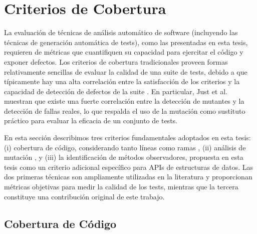



\section{Criterios de Cobertura}
\label{sec:coverage}
La evaluación de técnicas de análisis automático de software (incluyendo las
técnicas de generación automática de tests), como las presentadas en esta tesis, requieren de métricas que cuantifiquen su capacidad para ejercitar el código y exponer defectos. 
Los criterios de cobertura tradicionales proveen formas relativamente sencillas de evaluar 
la calidad de una suite de tests, debido a que típicamente hay una alta correlación entre
la satisfacción de los criterios y la capacidad de detección de defectos de la
suite \cite{Ammann16,just2014mutants}. 
En particular, Just et al.~\cite{just2014mutants} muestran que existe una fuerte
correlación entre la detección de mutantes y la detección de fallas reales, lo
que respalda el uso de la mutación como sustituto práctico para evaluar la
eficacia de un conjunto de tests.

En esta sección describimos tres criterios fundamentales adoptados en esta tesis: 
(i) cobertura de código, considerando tanto líneas como ramas \cite{Ammann16,myzili2012coverage}, 
(ii) análisis de mutación \cite{jia2011analysis,Ammann16,just2014mutants}, 
y (iii) la identificación de métodos observadores, propuesta en esta tesis como un criterio adicional
específico para APIs de estructuras de datos. 
Las dos primeras técnicas son ampliamente utilizadas en la literatura y proporcionan 
métricas objetivas para medir la calidad de los tests, mientras que la tercera constituye
una contribución original de este trabajo.

\subsection{Cobertura de Código}

